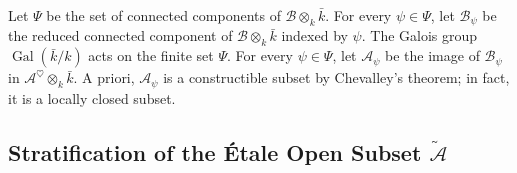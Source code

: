 \documentclass[12pt,english]{smfart}
\numberwithin{equation}{subsection}
\theoremstyle{remark}
\begin{document}
Let $\Psi$ be the set of connected components of $\mathcal{B}\otimes_k \bar{k}$. For every $\psi\in\Psi$, let $\mathcal{B}_\psi$ be the reduced connected component of $\mathcal{B}\otimes_k \bar{k}$ indexed by $\psi$. The Galois group $\operatorname{Gal}(\bar{k}/k)$ acts on the finite set $\Psi$. For every $\psi\in \Psi$, let $\mathcal{A}_\psi$ be the image of $\mathcal{B}_\psi$ in $\mathcal{A}^\heartsuit\otimes_k \bar{k}$. A priori, $\mathcal{A}_\psi$ is a constructible subset by Chevalley's theorem; in fact, it is a locally closed subset.


\subsection{Stratification of the \'Etale Open Subset $\tilde{\mathcal{A}}$}
\label{subsection : tilde A}
\end{document}
